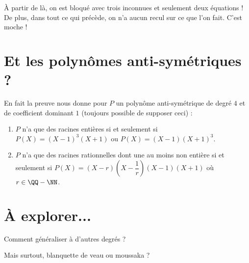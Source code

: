 \documentclass[12pt]{amsart}
\begin{document}
À partir de là, on est bloqué avec trois inconnues et seulement deux équations ! De plus, dans tout ce qui précède, on n'a aucun recul sur ce que l'on fait. C'est moche !



\section{Et les polynômes anti-symétriques ?}

En fait la preuve nous donne pour $P$ un polynôme anti-symétrique de degré $4$ et de coefficient dominant $1$ (toujours possible de supposer ceci) :

\begin{enumerate}
	\item $P$ n'a que des racines entières si et seulement si $P(X) = (X - 1)^3 (X + 1)$ ou $P(X) = (X - 1) (X + 1)^3$.

	\item $P$ n'a que des racines rationnelles dont une au moins non entière si et seulement si $P(X) = (X - r) \left( X - \dfrac1r \right) (X - 1) (X + 1)$ où $r \in \QQ - \NN$.
\end{enumerate}




\section{À explorer...}

Comment généraliser à d'autres degrés ?

\medskip

Mais surtout, blanquette de veau ou moussaka ?
\end{document}
